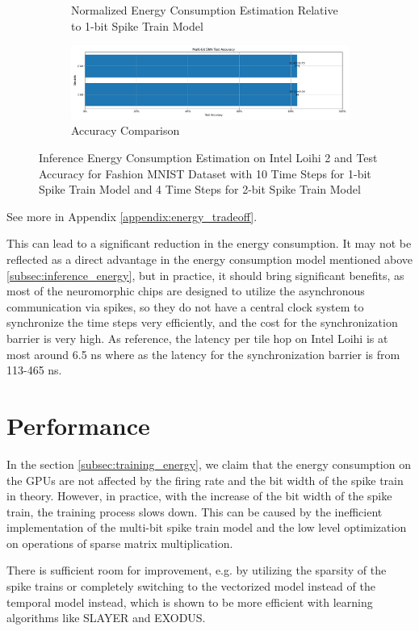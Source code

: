 \begin{figure}[!htpb]
\begin{subfigure}[H]{0.48\textwidth}
                \caption{Normalized Energy Consumption Estimation Relative to 1-bit Spike Train Model}
            \end{subfigure}
            \hfill
            \begin{subfigure}[H]{\textwidth}
                \centering
                \includegraphics[width=\textwidth]{../timesteps/FashionMNIST/plots/fashionmnist_final_acc.pdf}
                \caption{Accuracy Comparison}
            \end{subfigure}
            \caption{Inference Energy Consumption Estimation on Intel Loihi 2 and Test Accuracy for Fashion MNIST Dataset with 10 Time Steps for 1-bit Spike Train Model and 4 Time Steps for 2-bit Spike Train Model}
            \label{fig:inference_energy_nh_timesteps}
        \end{figure}
        
        See more in Appendix \ref{appendix:energy_tradeoff}.

        This can lead to a significant reduction in the energy consumption. It may not be reflected as a direct advantage in the energy consumption model mentioned above \ref{subsec:inference_energy}, but in practice, it should bring significant benefits, as most of the neuromorphic chips are designed to utilize the asynchronous communication via spikes, so they do not have a central clock system to synchronize the time steps very efficiently, and the cost for the synchronization barrier is very high. As reference, the latency per tile hop on Intel Loihi is at most around 6.5 ns where as the latency for the synchronization barrier is from 113-465 ns. 

\section{Performance}
\label{sec:performance}
    In the section \ref{subsec:training_energy}, we claim that the energy consumption on the GPUs are not affected by the firing rate and the bit width of the spike train in theory. However, in practice, with the increase of the bit width of the spike train, the training process slows down. This can be caused by the inefficient implementation of the multi-bit spike train model and the low level optimization on operations of sparse matrix multiplication. 

    There is sufficient room for improvement, e.g. by utilizing the sparsity of the spike trains or completely switching to the vectorized model instead of the temporal model instead, which is shown to be more efficient with learning algorithms like SLAYER and EXODUS. 

